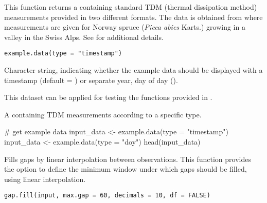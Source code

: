 \documentclass[a4paper]{book}
\begin{document}
%
\begin{Description}\relax
This function returns a  containing standard TDM (thermal dissipation method)
measurements provided in two different formats. The data is obtained from 
where  measurements are given for Norway spruce (\emph{Picea abies} Karts.)
growing in a valley in the Swiss Alps. See  for additional details.
\end{Description}
%
\begin{Usage}
\begin{verbatim}
example.data(type = "timestamp")
\end{verbatim}
\end{Usage}
%
\begin{Arguments}
\begin{ldescription}
\item[\code{type}] Character string, indicating whether the example data should be
displayed with a timestamp (default = )
or separate year, day of day ().
\end{ldescription}
\end{Arguments}
%
\begin{Details}\relax
This dataset can be applied for testing the functions provided in .
\end{Details}
%
\begin{Value}
A  containing TDM measurements according to a specific type.
\end{Value}
%
\begin{Examples}
\begin{ExampleCode}

# get example data
input_data <- example.data(type = "timestamp")
input_data <- example.data(type = "doy")
head(input_data)

\end{ExampleCode}
\end{Examples}
%
\begin{Description}\relax
Fills gaps by linear interpolation between observations.
This function provides the option to define the minimum window under which gaps should
be filled, using linear interpolation.
\end{Description}
%
\begin{Usage}
\begin{verbatim}
gap.fill(input, max.gap = 60, decimals = 10, df = FALSE)
\end{verbatim}
\end{Usage}
\end{document}
